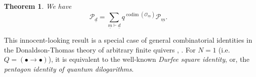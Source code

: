 \documentclass[a4paper]{amsart}
\DeclareMathOperator{\codim}{\mathrm{codim}}
\newcommand{\CO}{\mathcal{O}}
\newcommand{\CP}{\mathcal{P}}
\newcommand{\um}{\underline{m}}
\newcommand{\ud}{\underline{d}}
\newtheorem{thm}{Theorem}[section]
\theoremstyle{plain}
\begin{document}
\begin{thm} \label{thm:PdPm}
    We have
    \begin{equation}\label{eqn:5gon}
\CP_{\ud}
=
\sum_{\um \vdash \ud} 
q^{\codim(\CO_{\um})} 
\CP_{\um}.
\end{equation}
\end{thm}

This innocent-looking result is a special case of general combinatorial identities in the Donaldson-Thomas theory of arbitrary finite quivers \cite[Theorem 2.1]{Reineke}, \cite{RRcoha, RWY}. For $N=1$ (i.e. $Q=(\bullet \to \bullet)$), it is equivalent to the well-known {\em Durfee square identity}, or, the {\em pentagon identity of quantum dilogarithms}. 


\end{document}
